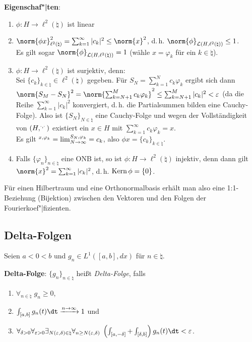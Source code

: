 \textbf{Eigenschaf"|ten}:
\begin{enumerate}
    \item
    $\phi\colon H \rightarrow \ell^2(\natural)$ ist linear

    \item
    $\norm{\phi x}_{\ell^2(\natural)}^2 =
    \sum_{k=1}^\infty |c_k|^2 \le \norm{x}^2$,
    d.\,h. $\norm{\phi}_{\L(H, \ell^2(\natural))} \le 1$.\\
    Es gilt sogar $\norm{\phi}_{\L(H, \ell^2(\natural))} = 1$
    (wähle $x = \varphi_k$ für ein $k \in \natural$).

    \item
    $\phi\colon H \rightarrow \ell^2(\natural)$ ist surjektiv, denn:\\
    Sei $\{c_k\}_{k \in \natural} \in \ell^2(\natural)$ gegeben.
    Für $S_N = \sum_{k=1}^N c_k \varphi_k$ ergibt sich dann\\
    $\norm{S_M - S_N}^2 = \norm{\sum_{k=N+1}^M c_k \varphi_k}^2 \le
    \sum_{k=N+1}^M |c_k|^2 < \varepsilon$
    (da die Reihe $\sum_{k=1}^\infty |c_k|^2$ konvergiert, d.\,h. die
    Partialsummen bilden eine Cauchy-Folge).
    Also ist $\{S_N\}_{N \in \natural}$ eine Cauchy-Folge und wegen der
    Vollständigkeit von $(H, \sp{\cdot, \cdot})$ existiert ein $x \in H$ mit
    $\sum_{k=1}^\infty c_k \varphi_k = x$.\\
    Es gilt $\sp{x, \varphi_k} =
    \lim_{N \to \infty} \sp{S_N, \varphi_k} = c_k$, also
    $\phi x = \{c_k\}_{k \in \natural}$.

    \item
    Falls $\{\varphi_n\}_{n \in \natural}$ eine ONB ist, so ist
    $\phi\colon H \rightarrow \ell^2(\natural)$ injektiv, denn dann gilt\\
    $\norm{x}^2 = \sum_{k=1}^\infty |c_k|^2$, d.\,h.
    $\operatorname{Kern} \phi = \{0\}$.
\end{enumerate}

Für einen Hilbertraum und eine Orthonormalbasis erhält man also eine
1:1-Beziehung (Bijektion) zwischen den Vektoren und den Folgen der
Fourierkoef"|fizienten.

\subsection{%
    Delta-Folgen%
}

Seien $a < 0 < b$ und $g_n \in L^1([a, b], dx)$ für $n \in \natural$.

\textbf{Delta-Folge}:
$\{g_n\}_{n \in \natural}$ heißt \emph{Delta-Folge}, falls
\begin{enumerate}
    \item
    $\forall_{n \in \natural}\; g_n \ge 0$,

    \item
    $\int_{[a, b]} g_n(t)\dt \xrightarrow{n \to \infty} 1$ und

    \item
    $\forall_{\delta > 0} \forall_{\varepsilon > 0}
    \exists_{N(\varepsilon, \delta) \in \natural}
    \forall_{n \ge N(\varepsilon, \delta)}\;
    \left(\int_{[a, -\delta]} + \int_{[\delta, b]}\right)
    g_n(t) \dt < \varepsilon$.
\end{enumerate}

